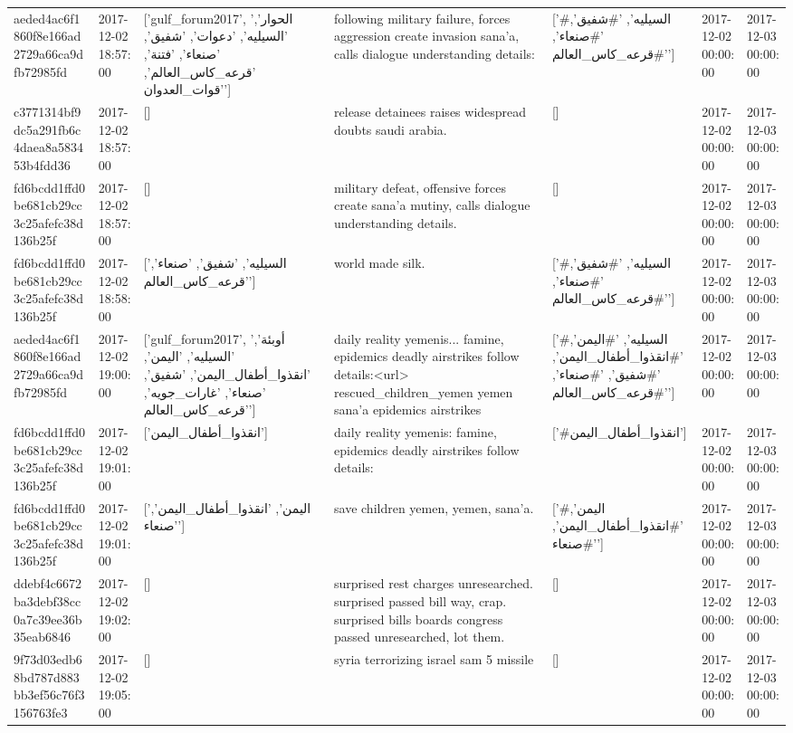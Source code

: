 \begin{tabular}{lllllll}
aeded4ac6f1860f8e166ad2729a66ca9dfb72985fd & 2017-12-02 18:57:00 & ['gulf_forum2017', 'الحوار', 'السيليه', 'دعوات', 'شفيق', 'صنعاء', 'فتنة', 'قرعه_كاس_العالم', 'قوات_العدوان'] & following military failure, forces aggression create invasion sana'a, calls dialogue understanding details: & ['#السيليه', '#شفيق', '#صنعاء', '#قرعه_كاس_العالم'] & 2017-12-02 00:00:00 & 2017-12-03 00:00:00 \\
c3771314bf9dc5a291fb6c4daea8a583453b4fdd36 & 2017-12-02 18:57:00 & [] & release detainees raises widespread doubts saudi arabia. & [] & 2017-12-02 00:00:00 & 2017-12-03 00:00:00 \\
fd6bcdd1ffd0be681cb29cc3c25afefc38d136b25f & 2017-12-02 18:57:00 & [] & military defeat, offensive forces create sana'a mutiny, calls dialogue understanding details. & [] & 2017-12-02 00:00:00 & 2017-12-03 00:00:00 \\
fd6bcdd1ffd0be681cb29cc3c25afefc38d136b25f & 2017-12-02 18:58:00 & ['السيليه', 'شفيق', 'صنعاء', 'قرعه_كاس_العالم'] & world made silk. & ['#السيليه', '#شفيق', '#صنعاء', '#قرعه_كاس_العالم'] & 2017-12-02 00:00:00 & 2017-12-03 00:00:00 \\
aeded4ac6f1860f8e166ad2729a66ca9dfb72985fd & 2017-12-02 19:00:00 & ['gulf_forum2017', 'أوبئة', 'السيليه', 'اليمن', 'انقذوا_أطفال_اليمن', 'شفيق', 'صنعاء', 'غارات_جويه', 'قرعه_كاس_العالم'] & daily reality yemenis... famine, epidemics deadly airstrikes follow details:<url> rescued\_children\_yemen yemen sana'a epidemics airstrikes & ['#السيليه', '#اليمن', '#انقذوا_أطفال_اليمن', '#شفيق', '#صنعاء', '#قرعه_كاس_العالم'] & 2017-12-02 00:00:00 & 2017-12-03 00:00:00 \\
fd6bcdd1ffd0be681cb29cc3c25afefc38d136b25f & 2017-12-02 19:01:00 & ['انقذوا_أطفال_اليمن'] & daily reality yemenis: famine, epidemics deadly airstrikes follow details: & ['#انقذوا_أطفال_اليمن'] & 2017-12-02 00:00:00 & 2017-12-03 00:00:00 \\
fd6bcdd1ffd0be681cb29cc3c25afefc38d136b25f & 2017-12-02 19:01:00 & ['اليمن', 'انقذوا_أطفال_اليمن', 'صنعاء'] & save children yemen, yemen, sana'a. & ['#اليمن', '#انقذوا_أطفال_اليمن', '#صنعاء'] & 2017-12-02 00:00:00 & 2017-12-03 00:00:00 \\
ddebf4c6672ba3debf38cc0a7c39ee36b35eab6846 & 2017-12-02 19:02:00 & [] & surprised rest charges unresearched. surprised passed bill way, crap. surprised bills boards congress passed unresearched, lot them. & [] & 2017-12-02 00:00:00 & 2017-12-03 00:00:00 \\
9f73d03edb68bd787d883bb3ef56c76f3156763fe3 & 2017-12-02 19:05:00 & [] & syria terrorizing israel sam 5 missile & [] & 2017-12-02 00:00:00 & 2017-12-03 00:00:00 \\

\end{tabular}
